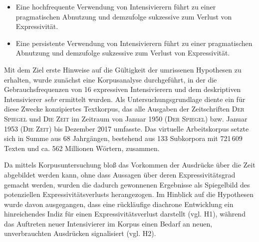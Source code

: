 \begin{itemize} 
\setlength{\itemindent}{1cm}
\item[\textbf{\textsc{H1-Freq}}] Eine hochfrequente Verwendung von Intensivierern führt zu einer pragmatischen Abnutzung und demzufolge sukzessive zum Verlust von Expressivität. 

\item[\textbf{\textsc{H1-Temp}}] Eine persistente Verwendung von Intensivierern führt zu einer pragmatischen Abnutzung und demzufolge sukzessive zum Verlust von Expressivität. 
\end{itemize}

Mit dem Ziel erste Hinweise auf die Gültigkeit der umrissenen Hypothesen zu erhalten, wurde zunächst eine Korpusanalyse durchgeführt, in der die Gebrauchsfrequenzen von 16 expressiven Intensivierern und dem deskriptiven Intensivierer \textit{sehr} ermittelt wurden. Als Untersuchungsgrundlage diente ein für diese Zwecke konzipiertes Textkorpus, das alle Ausgaben der Zeitschriften \textsc{Der Spiegel} und \textsc{Die Zeit} im Zeitraum von Januar 1950 (\textsc{Der Spiegel}) bzw. Januar 1953 (\textsc{Die Zeit}) bis Dezember 2017 umfasste. Das virtuelle Arbeitskorpus setzte sich in Summe aus 68 Jahrgängen, bestehend aus 133 Subkorpora mit 721\,609 Texten und ca. 562 Millionen Wörtern, zusammen.


Da mittels Korpusuntersuchung bloß das Vorkommen der Ausdrücke über die Zeit abgebildet werden kann, ohne dass Aussagen über deren Expressivitätsgrad gemacht werden, wurden die dadurch gewonnenen Ergebnisse als Spiegelbild des potenziellen Expressivitätsverlusts herangezogen. Im Hinblick auf die Hypothesen wurde davon ausgegangen, dass eine rückläufige diachrone Entwicklung ein hinreichendes Indiz für einen Expressivitätsverlust darstellt (vgl. H1), während das Auftreten neuer Intensivierer im Korpus einen Bedarf an neuen, unverbrauchten Ausdrücken signalisiert (vgl. H2).


